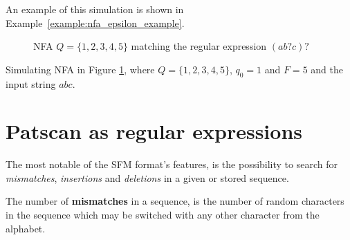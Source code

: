 \documentclass[12pt]{article}
\theoremstyle{definition}
\begin{document}
An example of this simulation is shown in Example~\ref{example:nfa_epsilon_example}.

\begin{figure}[H]
  \begin{center}

	
	\caption{NFA $Q = \{1, 2, 3, 4, 5\}$ matching the regular expression \underline{$(ab?c)?$}}
	\label{nfa_epsilon}
  \end{center}
\end{figure}

\begin{example}
\label{example:nfa_epsilon_example}
Simulating NFA in Figure \ref{nfa_epsilon}, where $Q = \{1, 2, 3, 4, 5\}$, $q_0 = 1$ and $F = 5$ and the input string $abc$. \\


\end{example}

\section{Patscan as regular expressions}

The most notable of the SFM format's features, is the possibility to search for \textit{mismatches}, \textit{insertions} and \textit{deletions} in a given or stored sequence. 

\begin{definition}
	The number of \textbf{mismatches} in a sequence, is the number of random characters in the sequence which may be switched with any other character from the alphabet.
\end{definition}
\end{document}
